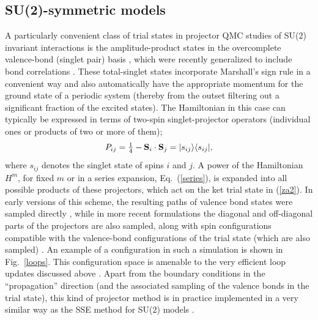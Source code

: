 \documentclass[10pt,pre,aps,twocolumn,showpacs,superscriptaddress,floatfix]{revtex4-1}
\begin{document}
\subsection{SU(2)-symmetric models}
\label{su2method}

A particularly convenient class of trial states in projector QMC studies of SU($2$) invariant interactions is the amplitude-product states in the overcomplete
valence-bond (singlet pair) basis \cite{Liang88}, which were recently generalized to include bond correlations \cite{Lin12}. These total-singlet states incorporate 
Marshall's sign rule in a convenient way and also automatically have the appropriate momentum for the ground state of a periodic system (thereby from the outset 
filtering out a significant fraction of the excited states). The Hamiltonian in this case can typically be expressed in terms of 
two-spin singlet-projector operators  (individual ones or products of two or more of them);
\begin{equation}
P_{ij}=\hbox{$\frac{1}{4}$}-{\bf S}_i\cdot {\bf S}_j = |s_{ij}\rangle\langle s_{ij}|,
\label{psinglet}
\end{equation}
where $s_{ij}$ denotes the singlet state of spins $i$ and $j$. A power of the Hamiltonian $H^m$, for fixed $m$ or in a series expansion, Eq.~(\ref{series}),
is expanded into all possible products of these projectors, which act on the ket trial state in (\ref{za2}). In early versions of this scheme, the resulting 
paths of valence bond states were sampled directly \cite{Liang90,Santoro99,Sandvik05}, while in more recent formulations the diagonal and off-diagonal parts of the 
projectors are also sampled, along with spin configurations compatible with the valence-bond configurations of the trial state (which are also sampled) 
\cite{Sandvik10c}. An example of a configuration in such a simulation is shown in Fig.~\ref{loops}. This configuration space is amenable to the very efficient 
loop updates discussed above \cite{Sandvik10a}. Apart from the boundary conditions in the ``propagation'' direction (and the associated sampling of the
valence bonds in the trial state), this kind of projector method is in practice implemented in a very similar way as the SSE method for SU($2$) 
models \cite{Sandvik10b}.
\end{document}
